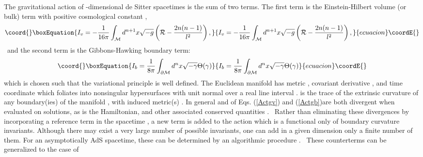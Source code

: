 \documentclass[a4paper,12pt,onecolumn]{revtex4}
\begin{document}
The gravitational action of \coordHE{}-dimensional de Sitter spacetimes is the
sum of two terms. The first term is the Einstein-Hilbert volume (or bulk)
term with positive cosmological constant \coordHE{},
\begin{equation}\coord{}\boxEquation{
I_v=-\frac 1{16\pi }\int_{\mathcal{M}}d^{n+1}x\sqrt{-g}\left( \mathcal{R}-
\frac{2n(n-1)}{l^2}\right) ,  \label{Actgv}
}{
I_v=-\frac 1{16\pi }\int_{\mathcal{M}}d^{n+1}x\sqrt{-g}\left( \mathcal{R}-
\frac{2n(n-1)}{l^2}\right) ,  }{ecuacion}\coordE{}\end{equation}
\ and the second term is the Gibbons-Hawking boundary term:
\begin{equation}\coord{}\boxEquation{
I_b=\frac 1{8\pi }\int_{\partial \mathcal{M}}d^nx\sqrt{-\gamma }\Theta
(\gamma )  \label{Actgb}
}{
I_b=\frac 1{8\pi }\int_{\partial \mathcal{M}}d^nx\sqrt{-\gamma }\Theta
(\gamma )  }{ecuacion}\coordE{}\end{equation}
which is chosen such that the variational principle is well
defined. The Euclidean manifold \coordHE{} has metric \coordHE{}, covariant
derivative \myHighlight{$\nabla _\mu $}\coordHE{}, and time coordinate \myHighlight{$\tau $}\coordHE{} which foliates \coordHE{} into nonsingular hypersurfaces \myHighlight{$\Sigma _\tau $}\coordHE{} with
unit normal \coordHE{} over a real line interval \myHighlight{$\Upsilon $}\coordHE{}.
\myHighlight{$\Theta $}\coordHE{} is the
trace of the extrinsic curvature \myHighlight{$\Theta ^{\mu \nu }$}\coordHE{} of any boundary(ies) \coordHE{} of the manifold \coordHE{}, with induced metric(s) \coordHE{}. In general \coordHE{} and \coordHE{} of Eqs. (\ref{Actgv})
and (\ref {Actgb})are both divergent when evaluated on solutions,
as is the Hamiltonian, and other associated conserved quantities
\cite{BY,BCM}. \ Rather than eliminating these divergences by
incorporating a reference term in the spacetime \cite{BCM,ivan}, a
new term \coordHE{} is added to the action which is a functional
only of boundary curvature invariants. Although there may exist a
very large number of possible invariants, one can add in a given
dimension only a finite number of them. For an asymptotically AdS
spacetime, these can be determined by an algorithmic procedure
\cite{kls}. \ These counterterms can be generalized to the case of
\end{document}

